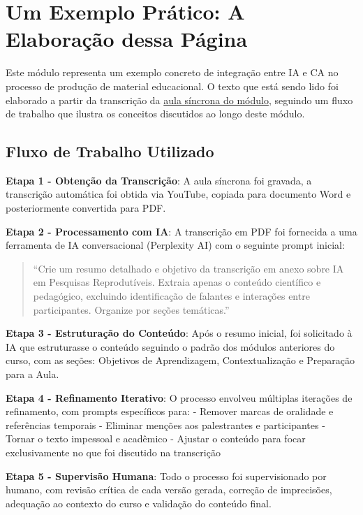 \documentclass[
  a4paper,
]{book}
\begin{document}
\section{Um Exemplo Prático: A Elaboração dessa
Página}\label{um-exemplo-pruxe1tico-a-elaborauxe7uxe3o-dessa-puxe1gina}

Este módulo representa um exemplo concreto de integração entre IA e CA
no processo de produção de material educacional. O texto que está sendo
lido foi elaborado a partir da transcrição da
\href{https://youtu.be/vbwMAiDVNf4}{aula síncrona do módulo}, seguindo
um fluxo de trabalho que ilustra os conceitos discutidos ao longo deste
módulo.

\subsection{Fluxo de Trabalho
Utilizado}\label{fluxo-de-trabalho-utilizado}

\textbf{Etapa 1 - Obtenção da Transcrição}: A aula síncrona foi gravada,
a transcrição automática foi obtida via YouTube, copiada para documento
Word e posteriormente convertida para PDF.

\textbf{Etapa 2 - Processamento com IA}: A transcrição em PDF foi
fornecida a uma ferramenta de IA conversacional (Perplexity AI) com o
seguinte prompt inicial:

\begin{quote}
``Crie um resumo detalhado e objetivo da transcrição em anexo sobre IA
em Pesquisas Reprodutíveis. Extraia apenas o conteúdo científico e
pedagógico, excluindo identificação de falantes e interações entre
participantes. Organize por seções temáticas.''
\end{quote}

\textbf{Etapa 3 - Estruturação do Conteúdo}: Após o resumo inicial, foi
solicitado à IA que estruturasse o conteúdo seguindo o padrão dos
módulos anteriores do curso, com as seções: Objetivos de Aprendizagem,
Contextualização e Preparação para a Aula.

\textbf{Etapa 4 - Refinamento Iterativo}: O processo envolveu múltiplas
iterações de refinamento, com prompts específicos para: - Remover marcas
de oralidade e referências temporais - Eliminar menções aos palestrantes
e participantes - Tornar o texto impessoal e acadêmico - Ajustar o
conteúdo para focar exclusivamente no que foi discutido na transcrição

\textbf{Etapa 5 - Supervisão Humana}: Todo o processo foi supervisionado
por humano, com revisão crítica de cada versão gerada, correção de
imprecisões, adequação ao contexto do curso e validação do conteúdo
final.
\end{document}
